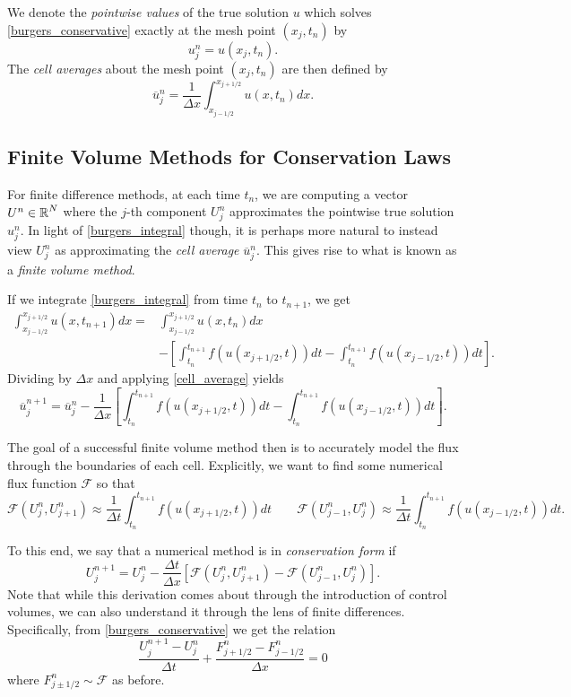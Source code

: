\documentclass{myproject}
\begin{document}
We denote the \emph{pointwise values} of the true solution $u$ which solves \eqref{burgers_conservative} exactly at the mesh point $(x_j, t_n)$ by 
\[
    u_j^n = u(x_j,t_n).
\]
The \emph{cell averages} about the mesh point $(x_j, t_n)$ are then defined by
\begin{equation}\label{cell_average}
    \overline{u}_j^n = \frac{1}{\Delta x} \int_{x_{j-1/2}}^{x_{j+1/2}} u(x,t_n) dx.
\end{equation}

\subsection{Finite Volume Methods for Conservation Laws}

For finite difference methods, at each time $t_n$, we are computing a vector $U^n \in \operatorname{\mathbb{R}}^N$ where the $j$-th component $U_j^n$ approximates the pointwise true solution $u_j^n$. In light of \eqref{burgers_integral} though, it is perhaps more natural to instead view $U_j^n$ as approximating the \emph{cell average} $\overline{u}_j^n$. This gives rise to what is known as a \emph{finite volume method}.

If we integrate \eqref{burgers_integral} from time $t_n$ to $t_{n+1}$, we get
\begin{align*}
    \int_{x_{j-1/2}}^{x_{j+1/2}} u(x,t_{n+1}) dx = &\int_{x_{j-1/2}}^{x_{j+1/2}} u(x,t_{n}) dx \\
    &- \left[ \int_{t_n}^{t_{n+1}} f(u(x_{j+1/2},t)) dt - \int_{t_n}^{t_{n+1}} f(u(x_{j-1/2},t)) dt \right].
\end{align*}
Dividing by $\Delta x$ and applying \eqref{cell_average} yields
\begin{equation}
    \overline{u}_j^{n+1} = \overline{u}_j^n - \frac{1}{\Delta x}\left[ \int_{t_n}^{t_{n+1}} f(u(x_{j+1/2},t)) dt - \int_{t_n}^{t_{n+1}} f(u(x_{j-1/2},t)) dt \right].
\end{equation}

The goal of a successful finite volume method then is to accurately model the flux through the boundaries of each cell. Explicitly, we want to find some numerical flux function $\mathcal{F}$ so that 
\[
    \mathcal{F}(U_j^n, U_{j+1}^n) \approx \frac{1}{\Delta t} \int_{t_n}^{t_{n+1}} f(u(x_{j+1/2}, t)) dt \qquad \mathcal{F}(U_{j-1}^n, U_{j}^n) \approx \frac{1}{\Delta t} \int_{t_n}^{t_{n+1}} f(u(x_{j-1/2}, t)) dt.
\]

To this end, we say that a numerical method is in \emph{conservation form} if 
\begin{equation}\label{conservation_form}
    U_j^{n+1} = U_j^n - \frac{\Delta t}{\Delta x} \left[ \mathcal{F}(U_{j}^{n}, U_{j+1}^{n}) - \mathcal{F}(U_{j-1}^{n}, U_{j}^{n}) \right].
\end{equation}
Note that while this derivation comes about through the introduction of control volumes, we can also understand it through the lens of finite differences. Specifically, from \eqref{burgers_conservative} we get the relation
\[
    \frac{U_j^{n+1} - U_j^n}{\Delta t} + \frac{F_{j+1/2}^n - F_{j-1/2}^n}{\Delta x} = 0
\]
where $F_{j\pm1/2}^n \sim \mathcal{F}$ as before.
\end{document}
